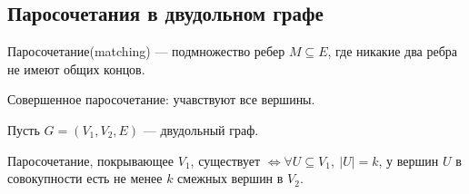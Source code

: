 \subsection{Паросочетания в двудольном графе}

\begin{defn}
    Паросочетание(matching) --- подмножество ребер $M \subseteq E$, где никакие два ребра не имеют общих концов.
\end{defn}

\begin{defn}
    Совершенное паросочетание: учавствуют все вершины.
\end{defn}

\begin{theorem}

    Пусть $G = (V_1, V_2, E)$ --- двудольный граф. 

    Паросочетание, покрывающее $V_1$, существует $\iff \forall U \subseteq V_1,~|U| = k$, у вершин $U$ в совокупности есть не менее $k$ смежных вершин в $V_2$.
\end{theorem}

